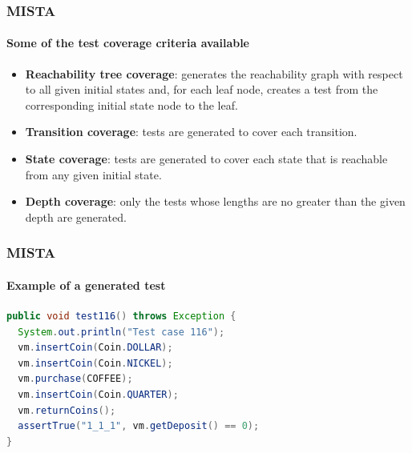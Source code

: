 \documentclass[notes]{beamer}
\begin{document}
\begin{frame}
  \frametitle{MISTA}
  \framesubtitle{Some of the test coverage criteria available}
  \begin{itemize}
    \item \textbf{Reachability tree coverage}: generates the reachability graph with respect to all given initial states and, for each leaf node, creates a test from the corresponding initial state node to the leaf.
    \item \textbf{Transition coverage}: tests are generated to cover each transition.
    \item \textbf{State coverage}: tests are generated to cover each state that is reachable from any given initial state.
    \item \textbf{Depth coverage}: only the tests whose lengths are no greater than the given depth are generated.
  \end{itemize}
\end{frame}

\begin{frame}[fragile]
\frametitle{MISTA}
\framesubtitle{Example of a generated test}
\begin{lstlisting}[language=Java,basicstyle=\ttfamily,keywordstyle=\color{red},caption={Example of a generated test based on Reachability tree coverage. Tries to check if the vending machine deposit is empty after returning the coins.}, captionpos=b]
public void test116() throws Exception {
  System.out.println("Test case 116");
  vm.insertCoin(Coin.DOLLAR);
  vm.insertCoin(Coin.NICKEL);
  vm.purchase(COFFEE);
  vm.insertCoin(Coin.QUARTER);
  vm.returnCoins();
  assertTrue("1_1_1", vm.getDeposit() == 0);
}
\end{lstlisting}
\end{frame}

\begin{frame}
  \titlepage
\end{frame}
\end{document}
